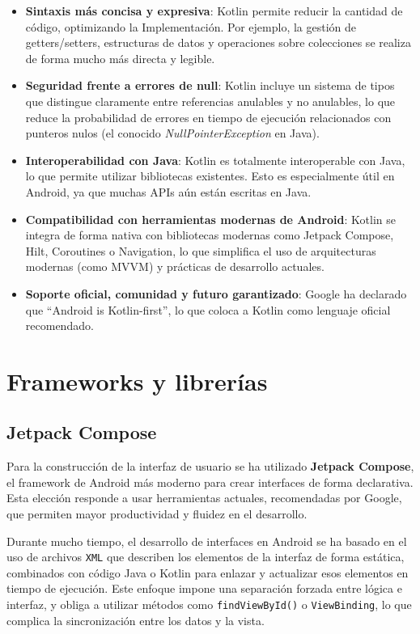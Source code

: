 \begin{itemize}
    \item \textbf{Sintaxis más concisa y expresiva}: Kotlin permite reducir la cantidad de código, optimizando la Implementación. Por ejemplo, la gestión de getters/setters, estructuras de datos y operaciones sobre colecciones se realiza de forma mucho más directa y legible.

    \item \textbf{Seguridad frente a errores de null}: Kotlin incluye un sistema de tipos que distingue claramente entre referencias anulables y no anulables, lo que reduce la probabilidad de errores en tiempo de ejecución relacionados con punteros nulos (el conocido \textit{NullPointerException} en Java).

    \item \textbf{Interoperabilidad con Java}: Kotlin es totalmente interoperable con Java, lo que permite utilizar bibliotecas existentes. Esto es especialmente útil en Android, ya que muchas APIs aún están escritas en Java.

    \item \textbf{Compatibilidad con herramientas modernas de Android}: Kotlin se integra de forma nativa con bibliotecas modernas como Jetpack Compose, Hilt, Coroutines o Navigation, lo que simplifica el uso de arquitecturas modernas (como MVVM) y prácticas de desarrollo actuales.

    \item \textbf{Soporte oficial, comunidad y futuro garantizado}: Google ha declarado que “Android is Kotlin-first”, lo que coloca a Kotlin como lenguaje oficial recomendado.
\end{itemize}

\section{Frameworks y librerías}

\subsection{Jetpack Compose}

Para la construcción de la interfaz de usuario se ha utilizado \textbf{Jetpack Compose}, el framework de Android más moderno para crear interfaces de forma declarativa. Esta elección responde a usar herramientas actuales, recomendadas por Google, que permiten mayor productividad y fluidez en el desarrollo.

Durante mucho tiempo, el desarrollo de interfaces en Android se ha basado en el uso de archivos \texttt{XML} que describen los elementos de la interfaz de forma estática, combinados con código Java o Kotlin para enlazar y actualizar esos elementos en tiempo de ejecución. Este enfoque impone una separación forzada entre lógica e interfaz, y obliga a utilizar métodos como \texttt{findViewById()} o \texttt{ViewBinding}, lo que complica la sincronización entre los datos y la vista.

